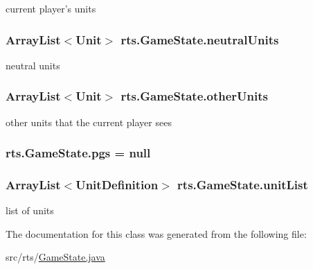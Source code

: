 \label{classrts_1_1_game_state_a37347cda7fc0b8cd1d2c2738b45bb068}
current player's units \hypertarget{classrts_1_1_game_state_a8e16ac422a2682adc45bc06e6e34dd07}{
\subsubsection[{neutralUnits}]{\setlength{\rightskip}{0pt plus 5cm}ArrayList$<${\bf Unit}$>$ {\bf rts.GameState.neutralUnits}}}
\label{classrts_1_1_game_state_a8e16ac422a2682adc45bc06e6e34dd07}
neutral units \hypertarget{classrts_1_1_game_state_aaf3bea167aabf21bf32fb44f72197bc4}{
\subsubsection[{otherUnits}]{\setlength{\rightskip}{0pt plus 5cm}ArrayList$<${\bf Unit}$>$ {\bf rts.GameState.otherUnits}}}
\label{classrts_1_1_game_state_aaf3bea167aabf21bf32fb44f72197bc4}
other units that the current player sees \hypertarget{classrts_1_1_game_state_a9e061a6e9a219af587ccbca6147fb60f}{
\subsubsection[{pgs}]{ {\bf rts.GameState.pgs} = null}}
\label{classrts_1_1_game_state_a9e061a6e9a219af587ccbca6147fb60f}
\hypertarget{classrts_1_1_game_state_a3e9c10b2ea5bd3d4bbc5eb77ec8f6c3f}{
\subsubsection[{unitList}]{\setlength{\rightskip}{0pt plus 5cm}ArrayList$<${\bf UnitDefinition}$>$ {\bf rts.GameState.unitList}}}
\label{classrts_1_1_game_state_a3e9c10b2ea5bd3d4bbc5eb77ec8f6c3f}
list of units 

The documentation for this class was generated from the following file:\begin{DoxyCompactItemize}
\item 
src/rts/\hyperlink{_game_state_8java}{GameState.java}\end{DoxyCompactItemize}
